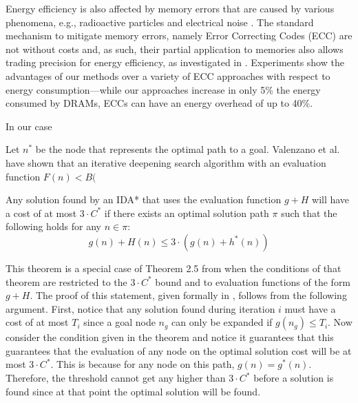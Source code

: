 Energy efficiency is also affected by memory errors that are caused by various phenomena, 
%
e.g., radioactive particles and electrical noise \cite{7266869}.
The standard mechanism to mitigate memory errors, namely Error Correcting Codes (ECC) are not without costs and, as such, their partial application to memories also allows trading precision for energy efficiency, as investigated in \cite{Luo:2014:CAM:2671853.2672438}.
%
 Experiments show the advantages of our methods over a variety of ECC approaches with respect to energy consumption---while our approaches increase in only 5\% the energy consumed by DRAMs, ECCs can have an energy overhead of up to 40\%.









 

In our case

Let $n^*$ be the node that represents the optimal path to a goal. 
Valenzano et al.~ have shown that an iterative deepening search algorithm with an evaluation function $F(n)<B($





\begin{theorem}
\label{theorem:sufficient_for_3C}
Any solution found by an IDA* that uses the evaluation function $g + H$ will have a cost of at most $3 \cdot C^*$ if there exists an optimal solution path $\pi$ such that the following holds for any $n \in \pi$:
$$g(n) + H(n) \leq 3 \cdot (g(n) + h^*(n))$$
\end{theorem}
This theorem is a special case of Theorem 2.5 from \cite{Valenzano:alternative_bounding} when the conditions of that theorem are restricted to the $3\cdot C^*$ bound and to evaluation functions of the form $g + H$.
The proof of this statement, given formally in \cite{Valenzano:alternative_bounding}, follows from the following argument.
First, notice that any solution found during iteration $i$ must have a cost of at most $T_i$ since a goal node $n_g$ can only be expanded if $g(n_g) \leq T_i$.
Now consider the condition given in the theorem and notice it guarantees that this guarantees that the evaluation of any node on the optimal solution cost will be at most $3 \cdot C^*$.
This is because for any node on this path, $g(n)=g^*(n)$.
Therefore, the threshold cannot get any higher than $3 \cdot C^*$ before a solution is found since at that point the optimal solution will be found.












